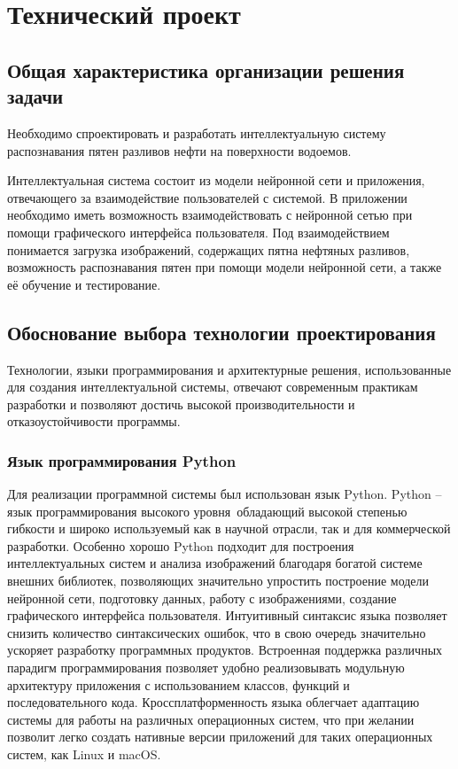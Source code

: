 \section{Технический проект}
\subsection{Общая характеристика организации решения задачи}

Необходимо спроектировать и разработать интеллектуальную систему распознавания пятен разливов нефти на поверхности водоемов.

Интеллектуальная система состоит из модели нейронной сети и приложения, отвечающего за взаимодействие пользователей с системой. В приложении необходимо иметь возможность взаимодействовать с нейронной сетью при помощи графического интерфейса пользователя. Под взаимодействием понимается загрузка изображений, содержащих пятна нефтяных разливов, возможность распознавания пятен при помощи модели нейронной сети, а также её обучение и тестирование.

\subsection{Обоснование выбора технологии проектирования}

Технологии, языки программирования и архитектурные решения, использованные для создания интеллектуальной системы, отвечают современным практикам разработки и позволяют достичь высокой производительности и отказоустойчивости программы.

\subsubsection{Язык программирования Python}

Для реализации программной системы был использован язык Python. Python -- язык программирования высокого уровня\, обладающий высокой степенью гибкости\cite{lutz_python1} и широко используемый как в научной отрасли, так и для коммерческой разработки. Особенно хорошо Python подходит для построения интеллектуальных систем и анализа изображений благодаря богатой системе внешних библиотек, позволяющих значительно упростить построение модели нейронной сети\cite{chollet_python}, подготовку данных, работу с изображениями, создание графического интерфейса пользователя. 
Интуитивный синтаксис языка позволяет снизить количество синтаксических ошибок, что в свою очередь значительно ускоряет разработку программных продуктов. Встроенная поддержка различных парадигм программирования позволяет удобно реализовывать модульную архитектуру приложения с использованием классов, функций и последовательного кода. Кроссплатформенность языка облегчает адаптацию системы для работы на различных операционных систем, что при желании позволит легко создать нативные версии приложений для таких операционных систем, как Linux и macOS\cite{lutz_python2}.


